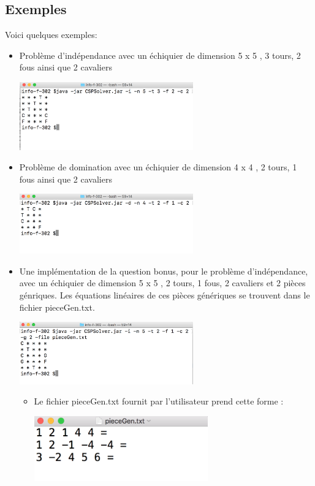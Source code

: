 \documentclass{article}
\begin{document}
\subsection{Exemples}
Voici quelques exemples:
\begin{itemize}
\item Problème d'indépendance avec un échiquier de dimension 5 x 5 , 3 tours, 2 fous ainsi que 2 cavaliers
 	\begin{center}
 		 	 \includegraphics[width=75mm,scale=0.8]{./CSPindep.png}
 	\end{center}
\item Problème de domination avec un échiquier de dimension 4 x 4 , 2 tours, 1 fous ainsi que 2 cavaliers
 	\begin{center}
 		 	 \includegraphics[width=75mm,scale=0.8]{./CSPdep.png}
 	\end{center}
\item Une implémentation de la question bonus, pour le problème d'indépendance, avec un échiquier de dimension 5 x 5 , 2 tours, 1 fous, 2 cavaliers et 2 pièces génriques. Les équations linéaires de ces pièces génériques se trouvent dans le fichier pieceGen.txt.
 	\begin{center}
 		 	 \includegraphics[width=75mm,scale=0.8]{./CSPgen.png}
 	\end{center}
 	\begin{itemize}
 	\item Le fichier pieceGen.txt fournit par l'utilisateur prend cette forme :
 	 	\begin{center}
 		 	 \includegraphics[width=75mm,scale=0.8]{./pieceGen.png}

\end{center}
\end{itemize}
\end{itemize}
\end{document}
